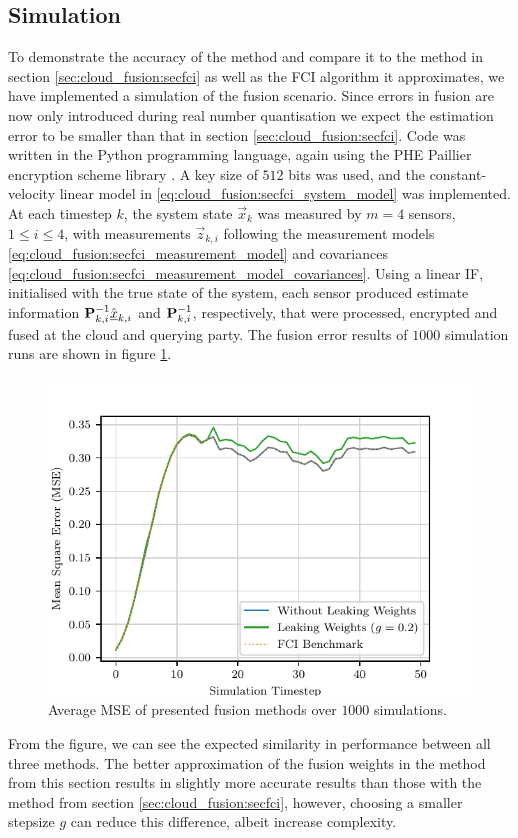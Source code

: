 \subsection{Simulation}\label{subsec:cloud_fusion:secfci2_simulation}
To demonstrate the accuracy of the method and compare it to the method in section \ref{sec:cloud_fusion:secfci} as well as the FCI algorithm it approximates, we have implemented a simulation of the fusion scenario. Since errors in fusion are now only introduced during real number quantisation we expect the estimation error to be smaller than that in section \ref{sec:cloud_fusion:secfci}. Code was written in the Python programming language, again using the PHE Paillier encryption scheme library \cite{csirosdata61PythonPaillierLibrary2013}. A key size of $512$ bits was used, and the constant-velocity linear model in \eqref{eq:cloud_fusion:secfci_system_model} was implemented. At each timestep $k$, the system state $\vec{x}_k$ was measured by $m=4$ sensors, $1\leq i \leq 4$, with measurements $\vec{z}_{k,i}$ following the measurement models \eqref{eq:cloud_fusion:secfci_measurement_model} and covariances \eqref{eq:cloud_fusion:secfci_measurement_model_covariances}. Using a linear IF, initialised with the true state of the system, each sensor produced estimate information ${{\mathbf{P}}}_{k, i}^{-1}\hat{{\underline{x}}}_{k, i}$ and ${{\mathbf{P}}}_{k, i}^{-1}$, respectively, that were processed, encrypted and fused at the cloud and querying party. The fusion error results of $1000$ simulation runs are shown in figure \ref{fig:cloud_fusion:secfci2_sim_error}. 
\begin{figure}[htbp]
    \centering
    \includegraphics{figures/cloud_fusion_secfci2_sim_error.pdf}
    \caption{Average MSE of presented fusion methods over $1000$ simulations.}
    \label{fig:cloud_fusion:secfci2_sim_error}
\end{figure}
From the figure, we can see the expected similarity in performance between all three methods. The better approximation of the fusion weights in the method from this section results in slightly more accurate results than those with the method from section \ref{sec:cloud_fusion:secfci}, however, choosing a smaller stepsize $g$ can reduce this difference, albeit increase complexity.

